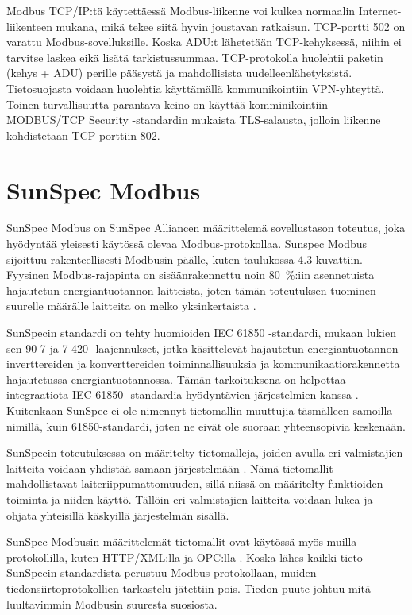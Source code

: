     Modbus TCP/IP:tä käytettäessä Modbus-liikenne voi kulkea normaalin Internet-liikenteen mukana, mikä tekee siitä hyvin joustavan ratkaisun. TCP-portti 502 on varattu Modbus-sovelluksille.\parencite{modbusTCPIPSpec} Koska ADU:t lähetetään TCP-kehyksessä, niihin ei tarvitse laskea eikä lisätä tarkistussummaa. TCP-protokolla huolehtii paketin (kehys + ADU) perille pääsystä ja mahdollisista uudelleenlähetyksistä. Tietosuojasta voidaan huolehtia käyttämällä kommunikointiin \gls{VPN}-yhteyttä. Toinen turvallisuutta parantava keino on käyttää komminikointiin MODBUS/TCP Security -standardin mukaista TLS-salausta, jolloin liikenne kohdistetaan TCP-porttiin 802\parencite{modbusTCPIPTLSSpec}.

\section{SunSpec Modbus}
  SunSpec Modbus on SunSpec Alliancen määrittelemä sovellustason toteutus, joka hyödyntää yleisesti käytössä olevaa Modbus-protokollaa. Sunspec Modbus sijoittuu rakenteellisesti Modbusin päälle, kuten taulukossa 4.3 kuvattiin. Fyysinen Modbus-rajapinta on sisäänrakennettu noin \SI{80}{\percent}:iin asennetuista hajautetun energiantuotannon laitteista, joten tämän toteutuksen tuominen suurelle määrälle laitteita on melko yksinkertaista \parencite{SSFactSheet}.

  SunSpecin standardi on tehty huomioiden \gls{IEC} 61850 -standardi, mukaan lukien sen 90-7 ja 7-420 -laajennukset, jotka käsittelevät hajautetun energiantuotannon inverttereiden ja konverttereiden toiminnallisuuksia ja kommunikaatiorakennetta hajautetussa energiantuotannossa. Tämän tarkoituksena on helpottaa integraatiota \gls{IEC} 61850 -standardia hyödyntävien järjestelmien kanssa \parencite{SSTech}. Kuitenkaan SunSpec ei ole nimennyt tietomallin muuttujia täsmälleen samoilla nimillä, kuin 61850-standardi, joten ne eivät ole suoraan yhteensopivia keskenään.

  SunSpecin toteutuksessa on määritelty tietomalleja, joiden avulla eri valmistajien laitteita voidaan yhdistää samaan järjestelmään \parencite{SSTech}. Nämä tietomallit mahdollistavat laiteriippumattomuuden, sillä niissä on määritelty funktioiden toiminta ja niiden käyttö. Tällöin eri valmistajien laitteita voidaan lukea ja ohjata yhteisillä käskyillä järjestelmän sisällä.

  SunSpec Modbusin määrittelemät tietomallit ovat käytössä myös muilla protokollilla, kuten \gls{HTTP}/\gls{XML}:lla ja \gls{OPC}:lla \parencite{SSTech}. Koska lähes kaikki tieto SunSpecin standardista perustuu Modbus-protokollaan, muiden tiedonsiirtoprotokollien tarkastelu jätettiin pois. Tiedon puute johtuu mitä luultavimmin Modbusin suuresta suosiosta.

